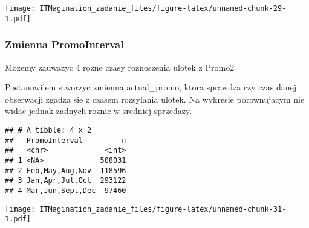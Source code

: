 \documentclass[]{article}
\newenvironment{Shaded}{\begin{snugshade}}{\end{snugshade}}
\newcommand{\DataTypeTok}[1]{\textcolor[rgb]{0.13,0.29,0.53}{#1}}
\newcommand{\DecValTok}[1]{\textcolor[rgb]{0.00,0.00,0.81}{#1}}
\newcommand{\KeywordTok}[1]{\textcolor[rgb]{0.13,0.29,0.53}{\textbf{#1}}}
\newcommand{\NormalTok}[1]{#1}
\newcommand{\OperatorTok}[1]{\textcolor[rgb]{0.81,0.36,0.00}{\textbf{#1}}}
\newcommand{\StringTok}[1]{\textcolor[rgb]{0.31,0.60,0.02}{#1}}
\begin{document}
\texttt{[image: ITMagination\_zadanie\_files/figure-latex/unnamed-chunk-29-1.pdf]}

\hypertarget{zmienna-promointerval}{%
\subsubsection{Zmienna PromoInterval}\label{zmienna-promointerval}}

Mozemy zauwazyc 4 rozne czasy roznoszenia ulotek z Promo2

Postanowilem stworzyc zmienna actual\_promo, ktora sprawdza czy czas
danej obserwacji zgadza sie z czasem rozsylania ulotek. Na wykresie
porownujacym nie widac jednak zadnych roznic w sredniej sprzedazy.

\begin{Shaded}
\end{Shaded}

\begin{verbatim}
## # A tibble: 4 x 2
##   PromoInterval         n
##   <chr>             <int>
## 1 <NA>             508031
## 2 Feb,May,Aug,Nov  118596
## 3 Jan,Apr,Jul,Oct  293122
## 4 Mar,Jun,Sept,Dec  97460
\end{verbatim}

\begin{Shaded}
\end{Shaded}

\texttt{[image: ITMagination\_zadanie\_files/figure-latex/unnamed-chunk-31-1.pdf]}
\end{document}
